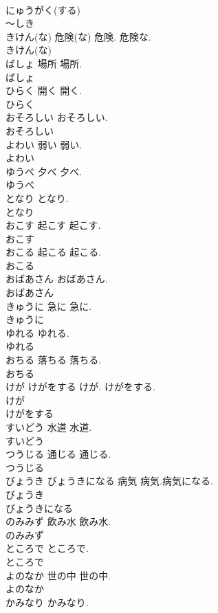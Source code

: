 \documentclass[8pt]{extreport}
\begin{document}
\begin{CJK}{UTF8}{min}
\\	にゅうがく(する)
\\	～しき
\\	きけん(な)	危険(な)	危険. 危険な.	
\\	きけん(な)
\\	ばしょ	場所	場所.	
\\	ばしょ
\\	ひらく	開く	開く.	
\\	ひらく
\\	おそろしい		おそろしい.	
\\	おそろしい
\\	よわい	弱い	弱い.	
\\	よわい
\\	ゆうべ	夕べ	夕べ.	
\\	ゆうべ
\\	となり		となり.	
\\	となり
\\	おこす	起こす	起こす.	
\\	おこす
\\	おこる	起こる	起こる.	
\\	おこる
\\	おばあさん		おばあさん.	
\\	おばあさん
\\	きゅうに	急に	急に.	
\\	きゅうに
\\	ゆれる		ゆれる.	
\\	ゆれる
\\	おちる	落ちる	落ちる.	
\\	おちる
\\	けが けがをする		けが. けがをする.	
\\	けが
\\	けがをする
\\	すいどう	水道	水道.	
\\	すいどう
\\	つうじる	通じる	通じる.	
\\	つうじる
\\	びょうき びょうきになる	病気	病気.病気になる.	
\\	びょうき
\\	びょうきになる
\\	のみみず	飲み水	飲み水.	
\\	のみみず
\\	ところで		ところで.	
\\	ところで
\\	よのなか	世の中	世の中.	
\\	よのなか
\\	かみなり		かみなり.	

\end{CJK}
\end{document}
